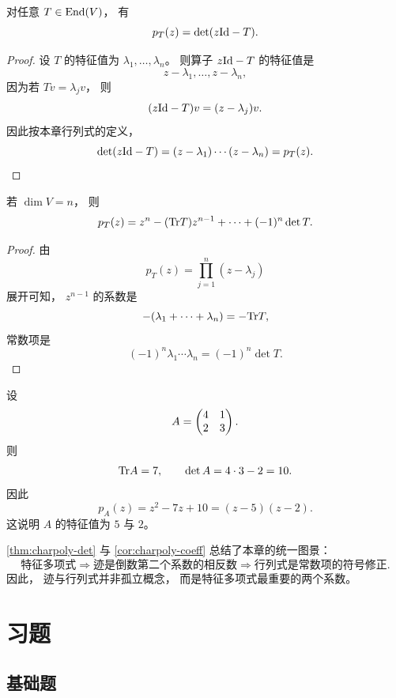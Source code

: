\begin{theorem}\label{thm:charpoly-det} 对任意 \(T\in \mathrm{End}(V)\)， 有 \[ p_T(z)=\det(z\mathrm{Id}-T). \] \end{theorem}




\begin{proof} 设 \(T\) 的特征值为 \(\lambda_1,\dots,\lambda_n\)。 则算子 \(z\mathrm{Id}-T\) 的特征值是 \[ z-\lambda_1,\dots,z-\lambda_n, \] 因为若 \(Tv=\lambda_j v\)， 则 \[ (z\mathrm{Id}-T)v=(z-\lambda_j)v. \] 因此按本章行列式的定义， \[ \det(z\mathrm{Id}-T) = (z-\lambda_1)\cdots(z-\lambda_n) = p_T(z). \] \end{proof}




\begin{corollary}\label{cor:charpoly-coeff} 若 \(\dim V=n\)， 则 \[ p_T(z)=z^n-(\mathrm{Tr} T)z^{n-1}+\cdots+(-1)^n\det T. \] \end{corollary}




\begin{proof} 由 \[ p_T(z)=\prod_{j=1}^n (z-\lambda_j) \] 展开可知， \(z^{n-1}\) 的系数是 \[ -(\lambda_1+\cdots+\lambda_n)=-\mathrm{Tr} T, \] 常数项是 \[ (-1)^n\lambda_1\cdots\lambda_n=(-1)^n\det T. \] \end{proof}




\begin{example} 设 \[ A=\begin{pmatrix} 4&1\\2&3 \end{pmatrix}. \] 则 \[ \mathrm{Tr} A=7,\qquad \det A=4\cdot3-2=10. \] 因此 \[ p_A(z)=z^2-7z+10=(z-5)(z-2). \] 这说明 \(A\) 的特征值为 \(5\) 与 \(2\)。 \end{example}




\begin{remark} \cref{thm:charpoly-det} 与 \cref{cor:charpoly-coeff} 总结了本章的统一图景： \[ \text{特征多项式} \Longrightarrow \text{迹是倒数第二个系数的相反数} \Longrightarrow \text{行列式是常数项的符号修正}. \] 因此， 迹与行列式并非孤立概念， 而是特征多项式最重要的两个系数。 \end{remark}




\section*{习题}




\subsection*{基础题}





